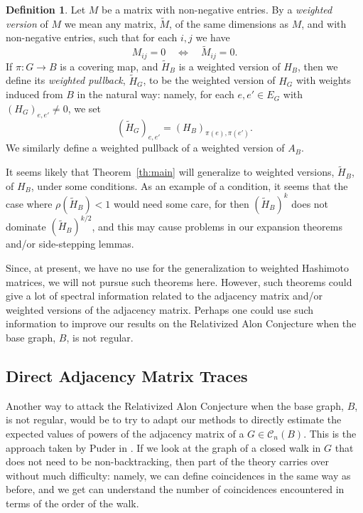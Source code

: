\documentclass{memo-l}
\theoremstyle{plain}
\theoremstyle{definition}
\newtheorem{definition}[theorem]{Definition}
\numberwithin{section}{chapter}
\numberwithin{equation}{chapter}
\newcommand{\from}{\colon}
\theoremstyle{plain}
\theoremstyle{definition}
\newcommand\cC{\mathcal{C}}
\begin{document}
\begin{definition} 
Let $M$ be a matrix with non-negative entries.
By a {\em weighted version} of $M$ we mean any matrix, $\widetilde M$,
of the same dimensions as $M$, and with non-negative entries, such that
for each $i,j$ we have
$$
M_{ij} = 0 \quad\iff\quad
\widetilde M_{ij}=0.
$$
If $\pi\from G\to B$ is a covering map, and
$\widetilde H_B$ is a weighted version of $H_B$, then we define
its {\em weighted pullback},
$\widetilde H_G$, to be the weighted version of $H_G$ with weights
induced from $B$ in the natural way: namely, for each $e,e'\in E_G$ with
$(H_G)_{e,e'}\ne 0$, we set
$$
(\widetilde H_G)_{e,e'} = (H_B)_{\pi(e),\pi(e')}.
$$
We similarly define a weighted pullback of a weighted version of $A_B$.
\end{definition}

It seems likely that Theorem~\ref{th:main}
will generalize to weighted versions, $\widetilde H_B$,
of $H_B$, under some conditions.
As an example of a condition, it seems that the case where
$\rho(\widetilde H_B)<1$ would need some care, for then
$(\widetilde H_B)^k$ does not dominate
$(\widetilde H_B)^{k/2}$, and this may cause problems in our
expansion theorems and/or side-stepping lemmas.

Since, at present, we have no use for the generalization to weighted
Hashimoto matrices, we will not pursue such theorems here.
However, such theorems could give a lot of 
spectral information related to the adjacency matrix and/or weighted
versions of the adjacency matrix.
Perhaps one could use such information to improve our results on the
Relativized Alon Conjecture when the base graph, $B$, is not regular.


\subsection{Direct Adjacency Matrix Traces}

Another way to attack the Relativized Alon Conjecture when the base
graph, $B$, is not regular, would be to try to adapt our methods
to directly estimate the expected values of powers of the
adjacency matrix of a $G\in\cC_n(B)$.
This is the approach taken by Puder in \cite{puder}.
If we look at the graph of a closed walk in $G$ that does not need 
to be non-backtracking, then part of the theory carries over without
much difficulty: namely, we can define coincidences in the same way
as before, and we get can understand the number of coincidences encountered
in terms of the order of the walk.
\end{document}
